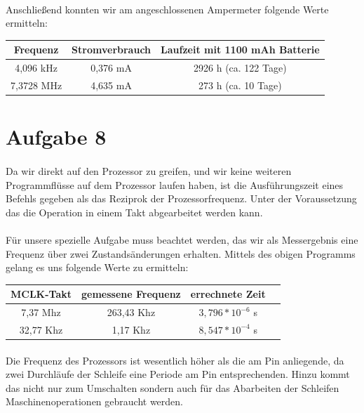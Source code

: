 

\paragraph*{}
Anschließend konnten wir am angeschlossenen Ampermeter folgende Werte ermitteln: \\

\begin{tabular}{ c | c | c }\hline \hline
Frequenz & Stromverbrauch & Laufzeit mit 1100 mAh Batterie \\ \hline
4,096 kHz & 0,376 mA & 2926 h (ca. 122 Tage) \\ \hline
7,3728 MHz & 4,635 mA & 273 h (ca. 10 Tage) \\ \hline
\end{tabular}

\section*{Aufgabe 8}

\paragraph*{}
Da wir direkt auf den Prozessor zu greifen, und wir keine weiteren Programmflüsse auf dem Prozessor laufen haben, ist die Ausführungszeit eines Befehls gegeben als das Reziprok der Prozessorfrequenz. Unter der Voraussetzung das die Operation in einem Takt abgearbeitet werden kann. 



\paragraph*{}
Für unsere spezielle Aufgabe muss beachtet werden, das wir als Messergebnis eine Frequenz über zwei Zustandsänderungen erhalten. Mittels des obigen Programms gelang es uns folgende Werte zu ermitteln: \\

\begin{tabular}{ c | c | c | c}\hline \hline
MCLK-Takt & gemessene Frequenz & errechnete Zeit \\ \hline
7,37 Mhz & 263,43 Khz & $ 3,796 * 10^{-6} $ s  \\ \hline
32,77 Khz & 1,17 Khz & $ 8,547 * 10^{-4} $ s  \\ \hline
\end{tabular}

\paragraph*{}
Die Frequenz des Prozessors ist wesentlich höher als die am Pin anliegende, da zwei Durchläufe der Schleife eine Periode am Pin entsprechenden. Hinzu kommt das nicht nur zum Umschalten sondern auch für das Abarbeiten der Schleifen Maschinenoperationen gebraucht werden. 

